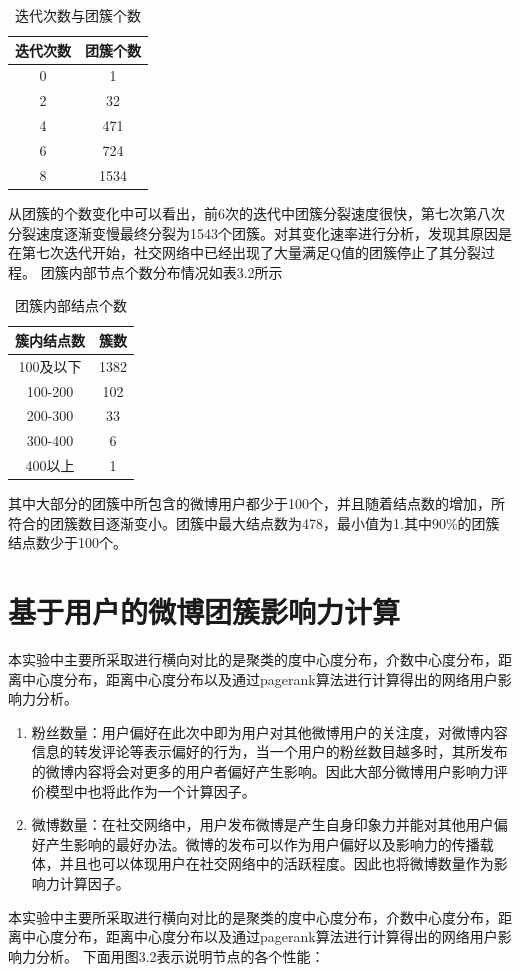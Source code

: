\begin{table}[htbp]
	\centering
	\caption[迭代次数与团簇个数]{迭代次数与团簇个数}
	\begin{tabular}{|c|c|}
		\hline
		迭代次数 & 团簇个数\\
		\hline
		0 & 1\\
		\hline
		2&32\\
		\hline
		4&471\\
		\hline
		6&724\\
		\hline
		8&1534\\
		\hline
	\end{tabular}
\end{table}
从团簇的个数变化中可以看出，前6次的迭代中团簇分裂速度很快，第七次第八次分裂速度逐渐变慢最终分裂为1543个团簇。对其变化速率进行分析，发现其原因是在第七次迭代开始，社交网络中已经出现了大量满足Q值的团簇停止了其分裂过程。
团簇内部节点个数分布情况如表3.2所示

\begin{table}[htbp]
	\centering
	\caption[团簇内部结点个数]{团簇内部结点个数}
	\begin{tabular}{|c|c|}
		\hline
		簇内结点数 & 簇数\\
		\hline
		100及以下 & 1382\\
		\hline
		100-200&102\\
		\hline
		200-300&33\\
		\hline
		300-400&6\\
		\hline
		400以上&1\\
		\hline
	\end{tabular}
\end{table}
其中大部分的团簇中所包含的微博用户都少于100个，并且随着结点数的增加，所符合的团簇数目逐渐变小。团簇中最大结点数为478，最小值为1.其中90\%的团簇结点数少于100个。

\section{ 基于用户的微博团簇影响力计算}
本实验中主要所采取进行横向对比的是聚类的度中心度分布，介数中心度分布，距离中心度分布，距离中心度分布以及通过pagerank算法进行计算得出的网络用户影响力分析。
\begin{enumerate}[(1)]
	\item 粉丝数量：用户偏好在此次中即为用户对其他微博用户的关注度，对微博内容信息的转发评论等表示偏好的行为，当一个用户的粉丝数目越多时，其所发布的微博内容将会对更多的用户者偏好产生影响。因此大部分微博用户影响力评价模型中也将此作为一个计算因子。
	\item 微博数量：在社交网络中，用户发布微博是产生自身印象力并能对其他用户偏好产生影响的最好办法。微博的发布可以作为用户偏好以及影响力的传播载体，并且也可以体现用户在社交网络中的活跃程度。因此也将微博数量作为影响力计算因子。
\end{enumerate}
本实验中主要所采取进行横向对比的是聚类的度中心度分布，介数中心度分布，距离中心度分布，距离中心度分布以及通过pagerank算法进行计算得出的网络用户影响力分析。
下面用图3.2表示说明节点的各个性能：

